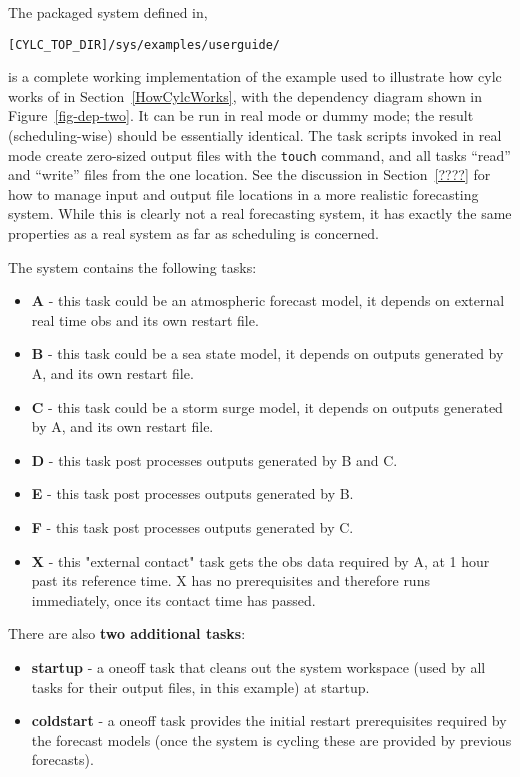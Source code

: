 

The packaged system defined in,

\begin{lstlisting}
[CYLC_TOP_DIR]/sys/examples/userguide/
\end{lstlisting}

is a complete working implementation of the example used to illustrate
how cylc works of in Section~\ref{HowCylcWorks}, with the dependency
diagram shown in Figure~\ref{fig-dep-two}. It can be run in real mode or
dummy mode; the result (scheduling-wise) should be essentially
identical. The task scripts invoked in real mode create zero-sized
output files with the \lstinline=touch= command, and all tasks ``read''
and ``write'' files from the one location. See the discussion in
Section~\ref{????} for how to manage input and output file locations in
a more realistic forecasting system. While this is clearly not a real
forecasting system, it has exactly the same properties as a real system
as far as scheduling is concerned.  

The system contains the following tasks:

\begin{itemize}
    \item {\bf A} - this task could be an atmospheric forecast model,
    it depends on external real time obs and its own restart file.
    \item {\bf B} - this task could be a sea state model, it depends on 
    outputs generated by A, and its own restart file.
    \item {\bf C} - this task could be a storm surge model, it depends on 
    outputs generated by A, and its own restart file.
    \item {\bf D} - this task post processes outputs generated by B and C.
    \item {\bf E} - this task post processes outputs generated by B.
    \item {\bf F} - this task post processes outputs generated by C.
    \item {\bf X} - this "external contact" task gets the obs data required
    by A, at 1 hour past its reference time. X has no prerequisites and
    therefore runs immediately, once its contact time has passed.
\end{itemize}

There are also {\bf two additional tasks}:

\begin{itemize}
    \item {\bf startup} - a oneoff task that cleans out the system
    workspace (used by all tasks for their output files, in this
    example) at startup.
    \item {\bf coldstart} - a oneoff task provides the initial restart
    prerequisites required by the forecast models (once the system
    is cycling these are provided by previous forecasts). 
\end{itemize}

